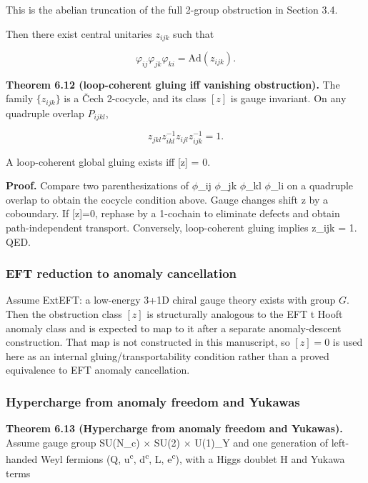 This is the abelian truncation of the full 2-group obstruction in Section 3.4.

Then there exist central unitaries \(z_{ijk}\) such that

\[
\varphi_{ij} \varphi_{jk} \varphi_{ki} = \mathrm{Ad}(z_{ijk}).
\]

\textbf{Theorem 6.12 (loop-coherent gluing iff vanishing obstruction).} The family \(\{z_{ijk}\}\) is a \v{C}ech 2-cocycle, and its class \([z]\) is gauge invariant. On any quadruple overlap \(P_{ijkl}\),

\[
z_{jkl} z_{ikl}^{-1} z_{ijl} z_{ijk}^{-1} = 1.
\]

A loop-coherent global gluing exists iff {[}z{]} = 0.

\textbf{Proof.} Compare two parenthesizations of \ensuremath{\phi}\_ij \ensuremath{\phi}\_jk \ensuremath{\phi}\_kl \ensuremath{\phi}\_li on a quadruple overlap to obtain the cocycle condition above. Gauge changes shift z by a coboundary. If {[}z{]}=0, rephase by a 1-cochain to eliminate defects and obtain path-independent transport. Conversely, loop-coherent gluing implies z\_ijk = 1. QED.

\subsubsection{EFT reduction to anomaly cancellation}\label{67-eft-reduction-to-anomaly-cancellation}

Assume ExtEFT: a low-energy 3+1D chiral gauge theory exists with group \(G\). Then the obstruction class \([z]\) is structurally analogous to the EFT \textquotesingle t Hooft anomaly class and is expected to map to it after a separate anomaly-descent construction. That map is not constructed in this manuscript, so \([z]=0\) is used here as an internal gluing/transportability condition rather than a proved equivalence to EFT anomaly cancellation.

\subsubsection{Hypercharge from anomaly freedom and Yukawas}\label{68-hypercharge-from-anomaly-freedom-and-yukawas}

\textbf{Theorem 6.13 (Hypercharge from anomaly freedom and Yukawas).} Assume gauge group SU(N\_c) \ensuremath{\times} SU(2) \ensuremath{\times} U(1)\_Y and one generation of left-handed Weyl fermions (Q, u\textsuperscript{c}, d\textsuperscript{c}, L, e\textsuperscript{c}), with a Higgs doublet H and Yukawa terms

